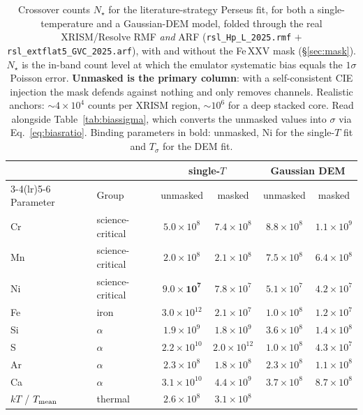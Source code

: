 \documentclass[11pt,a4paper]{article}
\newcommand{\code}[1]{\texttt{#1}}
\begin{document}
\begin{table}[t]
\centering
\caption{Crossover counts $N_\star$ for the literature-strategy Perseus fit, for
both a single-temperature and a Gaussian-DEM model, folded through the real
XRISM/Resolve RMF \emph{and} ARF (\code{rsl\_Hp\_L\_2025.rmf} $+$
\code{rsl\_extflat5\_GVC\_2025.arf}), with and without the Fe\,XXV mask
(\S\ref{sec:mask}). $N_\star$ is the in-band count level at which the emulator
systematic bias equals the $1\sigma$ Poisson error. \textbf{Unmasked is the
primary column}: with a self-consistent CIE injection the mask defends against
nothing and only removes channels. Realistic anchors: $\sim4\times10^4$ counts
per XRISM region, $\sim10^6$ for a deep stacked core. Read alongside
Table~\ref{tab:biassigma}, which converts the unmasked values into $\sigma$ via
Eq.~\eqref{eq:biasratio}. Binding parameters in bold: unmasked, Ni for the
single-$T$ fit and $T_\sigma$ for the DEM fit.}
\label{tab:hotfloor}
\begin{tabular}{llcccc}
\toprule
& & \multicolumn{2}{c}{single-$T$} & \multicolumn{2}{c}{Gaussian DEM} \\
\cmidrule(lr){3-4}\cmidrule(lr){5-6}
Parameter & Group & unmasked & masked & unmasked & masked \\
\midrule
Cr & science-critical & $5.0\times10^{8}$ & $7.4\times10^{8}$
                      & $8.8\times10^{8}$ & $1.1\times10^{9}$ \\
Mn & science-critical & $2.0\times10^{8}$ & $2.1\times10^{8}$
                      & $7.5\times10^{8}$ & $6.4\times10^{8}$ \\
Ni & science-critical & $\mathbf{9.0\times10^{7}}$ & $7.8\times10^{7}$
                      & $5.1\times10^{7}$ & $4.2\times10^{7}$ \\
Fe & iron             & $3.0\times10^{12}$ & $2.1\times10^{7}$
                      & $1.0\times10^{8}$ & $1.2\times10^{7}$ \\
Si & $\alpha$ & $1.9\times10^{9}$ & $1.8\times10^{9}$
              & $3.6\times10^{8}$ & $1.4\times10^{8}$ \\
S  & $\alpha$ & $2.2\times10^{10}$ & $2.0\times10^{12}$
              & $1.0\times10^{8}$ & $4.3\times10^{7}$ \\
Ar & $\alpha$ & $2.3\times10^{8}$ & $1.8\times10^{8}$
              & $2.3\times10^{8}$ & $1.1\times10^{8}$ \\
Ca & $\alpha$ & $3.1\times10^{10}$ & $4.4\times10^{9}$
              & $3.7\times10^{8}$ & $8.7\times10^{8}$ \\
$kT$ / $T_{\rm mean}$ & thermal & $2.6\times10^{8}$ & $3.1\times10^{8}$

\end{tabular}
\end{table}
\end{document}
